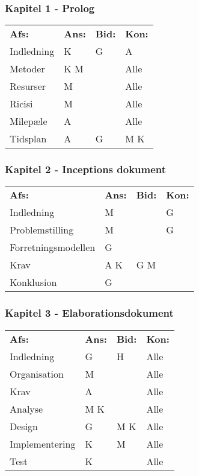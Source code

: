\subsubsection{Kapitel 1 - Prolog}
  \begin{tabular}{p{3cm}p{1.5cm}p{1.5cm}p{1.5cm}}
    \textbf{Afs:} &\textbf{Ans:} &\textbf{Bid:}  &\textbf{Kon:}
    \\ Indledning 	& K 	& G  	& A 
    \\ Metoder 		& K M 	& 		& Alle
    \\ Resurser		& M 	& 		& Alle
    \\ Ricisi  		& M 	& 		& Alle
    \\ Milepæle  	& A 	&  		& Alle
    \\ Tidsplan 	& A 	& G		& M K
    \\  
  \end{tabular}

\newpage

\subsubsection{Kapitel 2 - Inceptions dokument}
  \begin{tabular}{p{3cm}p{1.5cm}p{1.5cm}p{1.5cm}}
    \textbf{Afs:} &\textbf{Ans:} &\textbf{Bid:} &\textbf{Kon:}
    \\Indledning 			& M & & G
    \\Problemstilling 		& M & & G
    \\Forretningsmodellen 	& G & & 
    \\Krav 					& A K & G M &
    \\Konklusion 			& G & &
    \\
  \end{tabular}

\subsubsection{Kapitel 3 - Elaborationsdokument}
  \begin{tabular}{p{3cm}p{1.5cm}p{1.5cm}p{1.5cm}}
    \textbf{Afs:} &\textbf{Ans:} &\textbf{Bid:} &\textbf{Kon:}
    \\ Indledning 			& G 	& H		& Alle
    \\ Organisation 		& M 	& 		& Alle
    \\ Krav 				& A 	& 		& Alle
    \\ Analyse 				& M K 	& 		& Alle
    \\ Design 				& G 	& M K 	& Alle
    \\ Implementering 		& K 	& M 	& Alle
    \\ Test 				& K 	& 		& Alle
    \\
\end{tabular}

